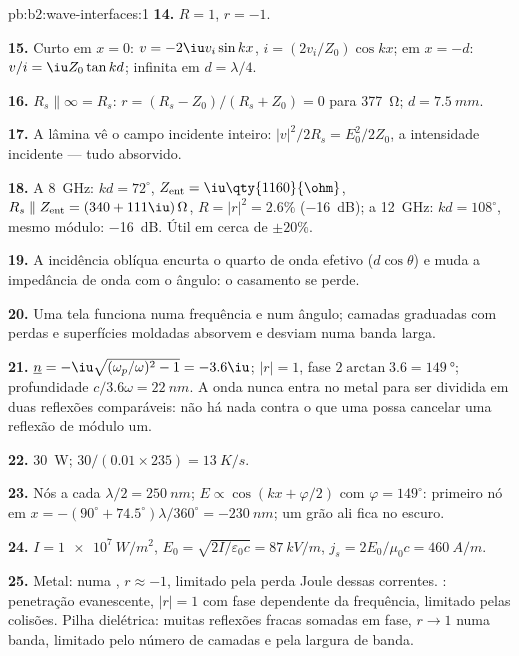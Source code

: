 \begin{solution}{pb:b2:wave-interfaces:1}
\textbf{14.} $R = 1$, $r = -1$.

\textbf{15.} Curto em $x = 0$: $v = -2\iu v_i\sin kx$, $i = (2v_i/Z_0)\cos kx$;
em $x = -d$: $v/i = \iu Z_0\tan kd$; infinita em $d = \lambda/4$.

\textbf{16.} $R_s \parallel \infty = R_s$: $r = (R_s - Z_0)/(R_s + Z_0) = 0$ para
\qty{377}{\ohm}; $d = \qty{7.5}{mm}$.

\textbf{17.} A lâmina vê o campo incidente inteiro: $|v|^2/2R_s =
E_0^2/2Z_0$, a intensidade incidente --- tudo absorvido.

\textbf{18.} A \qty{8}{GHz}: $kd = 72^\circ$, $Z_{\text{ent}} = \iu\qty{1160}{\ohm}$, $R_s \parallel
Z_{\text{ent}} = (340 + 111\iu)\,\Omega$, $R = |r|^2 = 2.6\%$ (\qty{-16}{dB}); a \qty{12}{GHz}:
$kd = 108^\circ$, mesmo módulo: \qty{-16}{dB}. Útil em cerca de $\pm20\%$.

\textbf{19.} A incidência oblíqua encurta o quarto de onda efetivo
($d\cos\theta$) e muda a impedância de onda com o ângulo: o
casamento se perde.

\textbf{20.} Uma tela funciona numa frequência e num ângulo; camadas
graduadas com perdas e superfícies moldadas absorvem e desviam numa banda larga.

\textbf{21.} $\underline n = -\iu\sqrt{(\omega_p/\omega)^2 - 1} = -3.6\iu$; $|r| = 1$, fase
$2\arctan3.6 = \qty{149}{\degree}$; profundidade $c/3.6\omega = \qty{22}{nm}$. A onda nunca
entra no metal para ser dividida em duas reflexões comparáveis: não há
nada contra o que uma  possa cancelar uma reflexão
de módulo um.

\textbf{22.} \qty{30}{W}; $30/(0.01 \times 235) = \qty{13}{K/s}$.

\textbf{23.} Nós a cada $\lambda/2 = \qty{250}{nm}$; $E \propto \cos(kx + \varphi/2)$ com $\varphi =
149^\circ$: primeiro nó em $x = -(90^\circ + 74.5^\circ)\lambda/360^\circ = \qty{-230}{nm}$; um
grão ali fica no escuro.

\textbf{24.} $I = \qty{1e7}{W/m^2}$, $E_0 = \sqrt{2I/\varepsilon_0c} = \qty{87}{kV/m}$, $j_s =
2E_0/\mu_0c = \qty{460}{A/m}$.

\textbf{25.} Metal:  numa , $r \approx -1$, limitado
pela perda Joule dessas correntes. : penetração evanescente,
$|r| = 1$ com fase dependente da frequência, limitado pelas colisões.
Pilha dielétrica: muitas reflexões fracas somadas em fase, $r \to 1$ numa
banda, limitado pelo número de camadas e pela largura de banda.
\end{solution}

